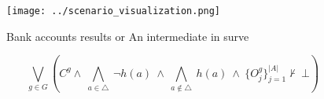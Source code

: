 \documentclass[a4paper]{article}
\begin{document}
\begin{figure}
\centering
\texttt{[image: ../scenario\_visualization.png]}
\caption{Bank accounts results or An intermediate in surve
}
\end{figure}
 
\[\bigvee_{g\in G} (C^g \wedge\ \bigwedge_{a\in \triangle}\ \neg h(a)\ \wedge\ \bigwedge_{a\notin \triangle}\ h(a)\ \wedge\ \{O_j^g\}_{j=1}^{|A|} \nvdash\ \bot )\]
\end{document}
